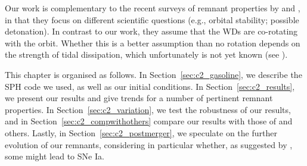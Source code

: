 Our work is complementary to the recent surveys of remnant properties by \cite{rask+12} and \cite{dan+12}, in that they focus on different scientific questions (e.g., orbital stability; possible detonation).  In contrast to our work, they assume that the WDs are co-rotating with the orbit.  Whether this is a better assumption than no rotation depends on the strength of tidal dissipation, which unfortunately is not yet known (see \citealt{marsns04,fulll12}).

This chapter is organised as follows.  In Section~\ref{sec:c2_gasoline}, we describe the SPH code we used, as well as our initial conditions.  In Section~\ref{sec:c2_results}, we present our results and give trends for a number of pertinent remnant properties.  In Section~\ref{sec:c2_variation}, we test the robustness of our results, and in Section~\ref{sec:c2_compwithothers} compare our results with those of \citeal{loreig09} and others.  Lastly, in Section~\ref{sec:c2_postmerger}, we speculate on the further evolution of our remnants, considering in particular whether, as suggested by \citeal{vkercj10}, some might lead to SNe Ia.
